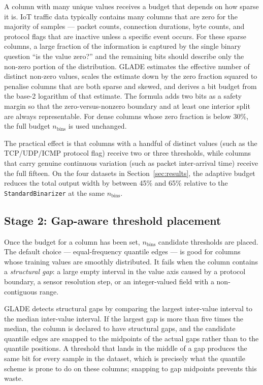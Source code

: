 \documentclass[journal,10pt]{IEEEtran}
\begin{document}
A column with many unique values receives a budget that depends on
how sparse it is. IoT traffic data typically contains many columns
that are zero for the majority of samples --- packet counts,
connection durations, byte counts, and protocol flags that are
inactive unless a specific event occurs. For these sparse columns, a
large fraction of the information is captured by the single binary
question ``is the value zero?'' and the remaining bits should
describe only the non-zero portion of the distribution. GLADE
estimates the effective number of distinct non-zero values, scales
the estimate down by the zero fraction squared to penalise columns
that are both sparse and skewed, and derives a bit budget from the
base-2 logarithm of that estimate. The formula adds two bits as a
safety margin so that the zero-versus-nonzero boundary and at least
one interior split are always representable. For dense columns whose
zero fraction is below 30\%, the full budget $n_\text{bins}$ is
used unchanged.

The practical effect is that columns with a handful of distinct
values (such as the TCP/UDP/ICMP protocol flag) receive two or three
thresholds, while columns that carry genuine continuous variation
(such as packet inter-arrival time) receive the full fifteen. On the
four datasets in Section~\ref{sec:results}, the adaptive budget
reduces the total output width by between 45\% and 65\% relative to
the \texttt{StandardBinarizer} at the same $n_\text{bins}$.

\subsection{Stage 2: Gap-aware threshold placement}
\label{sec:glade-gap}

Once the budget for a column has been set, $n_\text{bins}$ candidate
thresholds are placed. The default choice --- equal-frequency quantile
edges --- is good for columns whose training values are smoothly
distributed. It fails when the column contains a \emph{structural
gap}: a large empty interval in the value axis caused by a protocol
boundary, a sensor resolution step, or an integer-valued field with
a non-contiguous range.

GLADE detects structural gaps by comparing the largest inter-value
interval to the median inter-value interval. If the largest gap is
more than five times the median, the column is declared to have
structural gaps, and the candidate quantile edges are snapped to the
midpoints of the actual gaps rather than to the quantile positions.
A threshold that lands in the middle of a gap produces the same bit
for every sample in the dataset, which is precisely what the quantile
scheme is prone to do on these columns; snapping to gap midpoints
prevents this waste.
\end{document}
